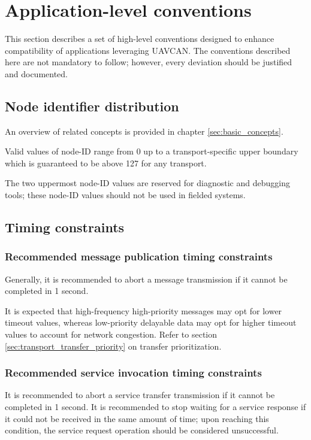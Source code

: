 \section{Application-level conventions}\label{sec:application_level_conventions}

This section describes a set of high-level conventions designed to enhance compatibility
of applications leveraging UAVCAN.
The conventions described here are not mandatory to follow;
however, every deviation should be justified and documented.

\subsection{Node identifier distribution}

An overview of related concepts is provided in chapter \ref{sec:basic_concepts}.

Valid values of node-ID range from 0 up to a transport-specific upper boundary
which is guaranteed to be above 127 for any transport.

The two uppermost node-ID values are reserved for diagnostic and debugging tools;
these node-ID values should not be used in fielded systems.

\subsection{Timing constraints}

\subsubsection{Recommended message publication timing constraints}

Generally, it is recommended to abort a message transmission if it cannot be completed in 1 second.

It is expected that high-frequency high-priority messages may opt for lower timeout values,
whereas low-priority delayable data may opt for higher timeout values to account for network congestion.
Refer to section \ref{sec:transport_transfer_priority} on transfer prioritization.

\subsubsection{Recommended service invocation timing constraints}

It is recommended to abort a service transfer transmission if it cannot be completed in 1 second.
It is recommended to stop waiting for a service response if it could not be received in the same amount of time;
upon reaching this condition, the service request operation should be considered unsuccessful.

